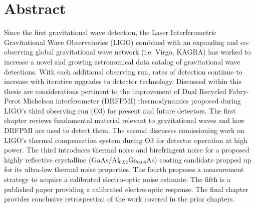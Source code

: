 \documentclass[12pt]{report}
\newcommand{\algaas}{\mathrm{Al_{0.92}Ga_{0.08}As}}
\newcommand{\gaas}{\mathrm{GaAs}}
\begin{document}

\thispagestyle{empty}

\chapter*{Abstract}
Since the first gravitational wave detection, the Laser Interferometric Gravitational Wave Observatories (LIGO) combined with an expanding and co-observing global gravitational wave network (i.e. Virgo, KAGRA) has worked to increase a novel and growing astronomical data catalog of gravitational wave detections. With each additional observing run, rates of detection continue to increase with iterative upgrades to detector technology. Discussed within this thesis are considerations pertinent to the improvement of Dual Recycled Fabry-Perot Michelson interferometer (DRFPMI) thermodynamics proposed during LIGO's third observing run (O3) for present and future detectors. The first chapter reviews fundamental material relevant to gravitational waves and how DRFPMI are used to detect them. The second discusses comissioning work on LIGO's thermal compensation system during O3 for detector operation at high power. The third introduces thermal noise and birefringent noise for a proposed highly reflective crystalline ($\gaas$/$\algaas$) coating candidate propped up for its ultra-low thermal noise properties. The fourth proposes a measurement strategy to acquire a calibrated electro-optic noise estimate. The fifth is a published paper providing a calibrated electro-optic response. The final chapter provides conclusive retrospection of the work covered in the prior chapters.  
\end{document}
